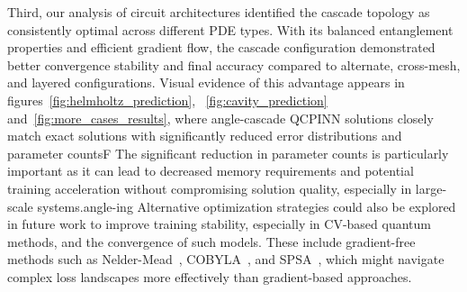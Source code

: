 Third, our analysis of circuit architectures identified the cascade topology as consistently optimal across different PDE types. With its balanced entanglement properties and efficient gradient flow, the cascade configuration demonstrated better convergence stability and final accuracy compared to alternate, cross-mesh, and layered configurations. Visual evidence of this advantage appears in figures~\ref{fig:helmholtz_prediction}, ~\ref{fig:cavity_prediction} and~\ref{fig:more_cases_results}, where angle-cascade QCPINN solutions closely match exact solutions with significantly reduced error distributions and parameter countsF The significant reduction in parameter counts is particularly important as it can lead to decreased memory requirements and potential training acceleration without compromising solution quality, especially in large-scale systems.angle-ing
Alternative optimization strategies could also be explored in future work to improve training stability, especially in CV-based quantum methods,  and the convergence of such models. These include gradient-free methods such as Nelder-Mead~\cite{nelder1965simplex}, COBYLA~\cite{powell1994direct}, and SPSA~\cite{spall1992multivariate}, which might navigate complex loss landscapes more effectively than gradient-based approaches. 